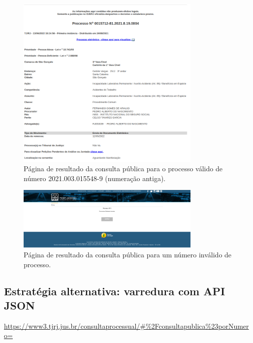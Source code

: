 \begin{figure}[H]
    \centering{}
    \includegraphics[width=0.8\textwidth,keepaspectratio]{img/exemplo-resultado-consulta-publica-1.png}
    \caption{%
        Página de resultado da consulta pública para o processo válido de
        número 2021.003.015548-9 (numeração antiga).
    }
    \label{fig:exemplo-pagina-ww4}
\end{figure}

\begin{figure}[H]
    \centering{}
    \includegraphics[width=0.8\textwidth,keepaspectratio]{img/exemplo-tjrj-pagina-erro}
    \caption{%
        Página de resultado da consulta pública para um número inválido de processo.
    }
    \label{fig:exemplo-tjrj-pagina-erro}
\end{figure}

\subsection{Estratégia alternativa: varredura com API JSON\label{sub:estrategia-api-json}}

\urldef\urlConsultaJson\url{https://www3.tjrj.jus.br/consultaprocessual/#%2Fconsultapublica%23porNumero=}


